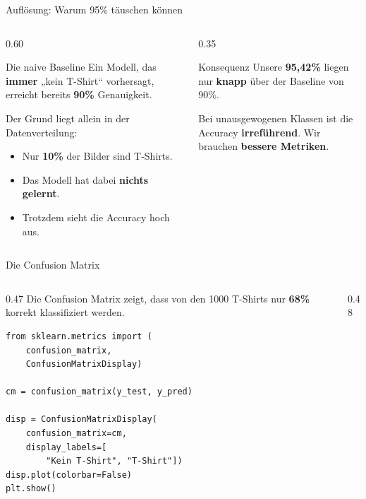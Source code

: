 \begin{frame}{Auflösung: Warum 95\% täuschen können}
\begin{columns}[T]
\begin{column}{0.60\textwidth}
\begin{block}{Die naive Baseline}
Ein Modell, das \textbf{immer} „kein T-Shirt“ vorhersagt, erreicht bereits \textbf{90\%} Genauigkeit.
\end{block}

Der Grund liegt allein in der Datenverteilung:
\begin{itemize}
\item Nur \textbf{10\%} der Bilder sind T-Shirts.
\item Das Modell hat dabei \textbf{nichts gelernt}.
\item Trotzdem sieht die Accuracy hoch aus.
\end{itemize}
\end{column}
\begin{column}{0.35\textwidth}
\vspace{0.5em}
\begin{alertblock}{Konsequenz}
Unsere \textbf{95{,}42\%} liegen nur \textbf{knapp} über der Baseline von 90\%.

\vspace{0.3em}
Bei unausgewogenen Klassen ist die Accuracy \textbf{irreführend}. Wir brauchen \textbf{bessere Metriken}.
\end{alertblock}
\end{column}
\end{columns}
\end{frame}


\begin{frame}[fragile]{Die Confusion Matrix}
\begin{columns}
\begin{column}{0.47\textwidth}
\footnotesize
Die Confusion Matrix zeigt, dass von den 1000 T-Shirts nur \textbf{68\%} korrekt klassifiziert werden.
\vspace{0.5em}
\begin{verbatim}
from sklearn.metrics import (
    confusion_matrix,
    ConfusionMatrixDisplay)

cm = confusion_matrix(y_test, y_pred)

disp = ConfusionMatrixDisplay(
    confusion_matrix=cm,
    display_labels=[
        "Kein T-Shirt", "T-Shirt"])
disp.plot(colorbar=False)
plt.show()
\end{verbatim}
\end{column}
\begin{column}{0.48\textwidth}
\centering

\end{column}
\end{columns}
\end{frame}


